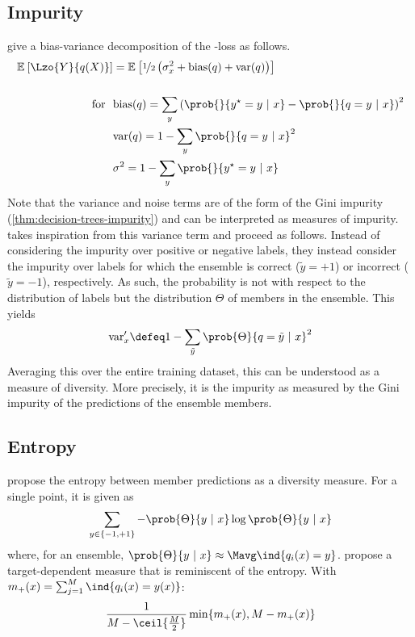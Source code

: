 \documentclass[../main.tex]{subfiles}
\begin{document}
\subsection{Impurity} 
\citeauthor{kohavi_BiasVarianceDecomposition_} \cite{kohavi_BiasVarianceDecomposition_} give a bias-variance decomposition of the \zeroone-loss as follows.
$$
\begin{align}
\mathbb{E}_{}\left[ \Lzo{Y}{q(X)} \right] &= 
\mathbb{E}_{}\left[  
\nicefrac{1}{2}\left( \sigma^2_{x} + \text{bias}(q) + \text{var}(q)   \right)
\right] \\ \\
\text{for} ~ ~ & \text{bias}(q) =  \sum_{y} \left(  \prob{}{y^\star = y ~|~x} - \prob{}{q=y ~|~ x} \right)^2 \\
& \text{var}(q) = 1 - \sum_{y} \prob{}{q=y ~|~x}^2  \\
& \sigma^2 = 1 - \sum_{y} \prob{}{y^\star = y ~|~ x}
\end{align}
$$
Note that the variance and noise terms are of the form of the Gini impurity (\cref{thm:decision-trees-impurity}) and can be interpreted as measures of impurity.
\citeauthor{kuncheva_MeasuresDiversityClassifier_2003} \cite{kuncheva_MeasuresDiversityClassifier_2003} takes inspiration from this variance term and proceed as follows. Instead of considering the impurity over positive or negative labels, they instead consider the impurity over labels for which the ensemble is correct ($\tilde{y} = +1$) or incorrect ($\tilde{y} = -1$), respectively. As such, the probability is not with respect to the distribution of labels but the distribution $\Theta$ of members in the ensemble. 
This yields
$$
\text{var}'_{x} \defeq 1 - \sum_{\tilde{y}} \prob{\Theta}{q = \tilde{y} ~ |~ x}^2
$$
Averaging this over the entire training dataset, this can be understood as a measure of diversity. More precisely, it is the impurity as measured by the Gini impurity of the predictions of the ensemble members.

\subsection{Entropy}
\citeauthor{cunningham_DiversityQualityClassification_2000} \cite{cunningham_DiversityQualityClassification_2000} propose the entropy between member predictions as a diversity measure. For a single point, it is given as
$$
\sum_{y \in \{ -1, +1 \}} - \prob{\Theta}{y ~|~x} \log \prob{\Theta}{y~|~x}
$$
where, for an ensemble, $\prob{\Theta}{y~|~x} \approx \Mavg \ind{q_{i}(x) = y}$.
\citeauthor{shipp_RelationshipsCombinationMethods_2002} \cite{shipp_RelationshipsCombinationMethods_2002} propose a target-dependent measure that is reminiscent of the entropy. With $m_{+}(x) = \sum_{j=1}^M \ind{q_{i}(x) = y(x)}$:
$$
\frac{1}{M - \ceil{\frac{M}{2}}} \min \{ m_{+}(x), M-m_{+}(x) \}
$$
\end{document}
